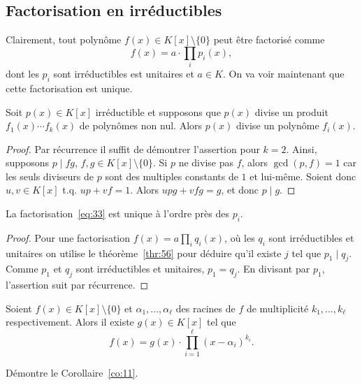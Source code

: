 \subsection{Factorisation en irréductibles}
\label{sec:fact-en-irred}
Clairement, tout polynôme $f(x) ∈ K[x] \setminus \{0\}$    peut être factorisé comme
\begin{equation}
  \label{eq:33}
  f(x) = a ⋅ ∏_i p_i(x),
\end{equation}
dont les $p_i$ sont irréductibles est unitaires et $a ∈ K$. On va voir maintenant que cette factorisation est unique. 

\begin{theorem}
\label{thr:56}
  Soit $p(x) ∈K[x]$ irréductible et supposons que $p(x)$ divise un produit $f_1(x) \cdots f_k(x)$ de polynômes non nul. Alors $p(x)$ divise un polynôme $f_i(x)$. 
\end{theorem}


\begin{proof}
  Par récurrence il suffit de démontrer l'assertion pour $k=2$. Ainsi, supposons $p \mid fg$, $f,g ∈K[x] \setminus \{0\}$. Si $p$ ne divise pas $f$, alors $\gcd(p,f) = 1$ car les seuls diviseurs de $p$ sont des multiples constants de $1$ et lui-même. Soient donc $u,v ∈ K[x]$ t.q.  $up + vf = 1$. Alors $upg + vfg = g$, et donc $p \mid g$. 
\end{proof}


\begin{theorem}
  \label{thr:57}
  La factorisation~\eqref{eq:33} est unique à l'ordre près des $p_i$. 
\end{theorem}

\begin{proof}
  Pour une  factorisation $f(x) = a ∏_i q_i(x)$, où les $q_i$ sont irréductibles et unitaires on utilise le théorème~\ref{thr:56} pour déduire qu'il  existe $j$ tel que  $p_1 \mid q_j$. Comme $p_1$ et $q_j$ sont  irréductibles et unitaires, $p_1 = q_j$. En divisant par $p_1$, l'assertion suit par récurrence. 
\end{proof}


\begin{corollary}
  \label{co:11}
  Soient $f(x) ∈ K[x] \setminus \{0\}$ et $α_1,\dots, α_ℓ$ des racines de $f$ de multiplicité $k_1,\dots,k_ℓ$ respectivement. Alors il existe $g(x)∈ K[x]$ tel que  
  \begin{displaymath}
    f(x) = g(x) ⋅ ∏_{i=1}^ℓ (x - α_i)^{k_i} .
  \end{displaymath}
\end{corollary}

\begin{exercise}
  Démontre le Corollaire~\ref{co:11}. 
\end{exercise}


